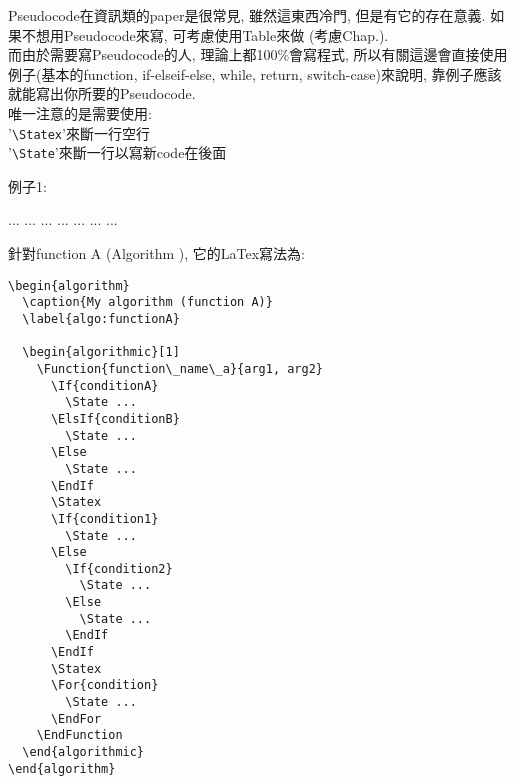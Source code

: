 
Pseudocode在資訊類的paper是很常見, 雖然這東西冷門, 但是有它的存在意義.
如果不想用Pseudocode來寫, 可考慮使用Table來做 (考慮Chap.).\\

而由於需要寫Pseudocode的人, 理論上都100\%會寫程式, 所以有關這邊會直接使用例子(基本的function, if-elseif-else, while, return, switch-case)來說明, 靠例子應該就能寫出你所要的Pseudocode.\\

唯一注意的是需要使用:\\
'\verb|\Statex|'來斷一行空行\\
'\verb|\State|'來斷一行以寫新code在後面


\newpage
例子1:
\begin{algorithm}
  \caption{My algorithm (function A)}
  \label{algo:functionA}

  \begin{algorithmic}[1]
        \State ...
        \State ...
      \Else
        \State ...
      \EndIf
      \Statex
        \State ...
      \Else
          \State ...
        \Else
          \State ...
        \EndIf
      \EndIf
      \Statex
        \State ...
      \EndFor
    \EndFunction
  \end{algorithmic}
\end{algorithm}

\newpage
針對function A (Algorithm ), 它的LaTex寫法為:
\EmptyLine
\begin{DescriptionFrame}
  \begin{verbatim}
\begin{algorithm}
  \caption{My algorithm (function A)}
  \label{algo:functionA}

  \begin{algorithmic}[1]
    \Function{function\_name\_a}{arg1, arg2}
      \If{conditionA}
        \State ...
      \ElsIf{conditionB}
        \State ...
      \Else
        \State ...
      \EndIf
      \Statex
      \If{condition1}
        \State ...
      \Else
        \If{condition2}
          \State ...
        \Else
          \State ...
        \EndIf
      \EndIf
      \Statex
      \For{condition}
        \State ...
      \EndFor
    \EndFunction
  \end{algorithmic}
\end{algorithm}
  \end{verbatim}
\end{DescriptionFrame}

